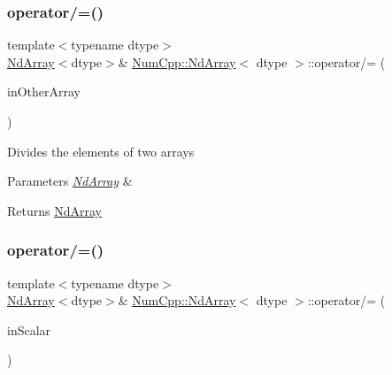\subsubsection{\texorpdfstring{operator/=()}{operator/=()}\hspace{0.1cm}{\footnotesize\ttfamily [1/2]}}
{\footnotesize\ttfamily template$<$typename dtype$>$ \\
\mbox{\hyperlink{class_num_cpp_1_1_nd_array}{Nd\+Array}}$<$dtype$>$\& \mbox{\hyperlink{class_num_cpp_1_1_nd_array}{Num\+Cpp\+::\+Nd\+Array}}$<$ dtype $>$\+::operator/= (\begin{DoxyParamCaption}\item[{const \mbox{\hyperlink{class_num_cpp_1_1_nd_array}{Nd\+Array}}$<$ dtype $>$ \&}]{in\+Other\+Array }\end{DoxyParamCaption})\hspace{0.3cm}{\ttfamily [inline]}}

Divides the elements of two arrays


\begin{DoxyParams}{Parameters}
{\em \mbox{\hyperlink{class_num_cpp_1_1_nd_array}{Nd\+Array}}} & \\
\hline
\end{DoxyParams}
\begin{DoxyReturn}{Returns}
\mbox{\hyperlink{class_num_cpp_1_1_nd_array}{Nd\+Array}} 
\end{DoxyReturn}
\mbox{\label{class_num_cpp_1_1_nd_array_a69ead52a985c3ad7bc61a731c8d8337a}} 
\subsubsection{\texorpdfstring{operator/=()}{operator/=()}\hspace{0.1cm}{\footnotesize\ttfamily [2/2]}}
{\footnotesize\ttfamily template$<$typename dtype$>$ \\
\mbox{\hyperlink{class_num_cpp_1_1_nd_array}{Nd\+Array}}$<$dtype$>$\& \mbox{\hyperlink{class_num_cpp_1_1_nd_array}{Num\+Cpp\+::\+Nd\+Array}}$<$ dtype $>$\+::operator/= (\begin{DoxyParamCaption}\item[{dtype}]{in\+Scalar }\end{DoxyParamCaption})\hspace{0.3cm}{\ttfamily [inline]}}

